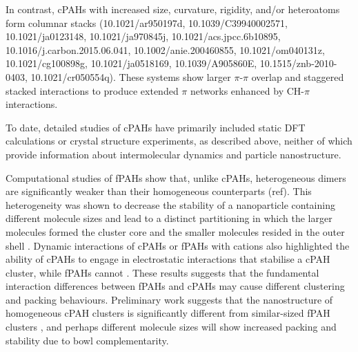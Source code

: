 In contrast, cPAHs with increased size, curvature, rigidity, and/or heteroatoms form columnar stacks (10.1021/ar950197d, 10.1039/C39940002571, 10.1021/ja0123148, 10.1021/ja970845j, 10.1021/acs.jpcc.6b10895, 10.1016/j.carbon.2015.06.041, 10.1002/anie.200460855, 10.1021/om040131z, 10.1021/cg100898g, 10.1021/ja0518169, 10.1039/A905860E, 10.1515/znb-2010-0403, 10.1021/cr050554q). These systems show larger $\pi$-$\pi$ overlap and staggered stacked interactions to produce extended $\pi$ networks enhanced by CH-$\pi$ interactions.


To date, detailed studies of cPAHs have primarily included static DFT calculations or crystal structure experiments, as described above, neither of which provide information about intermolecular dynamics and particle nanostructure.


Computational studies of fPAHs show that, unlike cPAHs, heterogeneous dimers are significantly weaker than their homogeneous counterparts (ref). This heterogeneity was shown to decrease the stability of a nanoparticle containing different molecule sizes and lead to a distinct partitioning in which the larger molecules formed the cluster core and the smaller molecules resided in the outer shell \cite{bowal2018partitioning}. Dynamic interactions of cPAHs or fPAHs with cations also highlighted the ability of cPAHs to engage in electrostatic interactions that stabilise a cPAH cluster, while fPAHs cannot \cite{bowal2019ion}. These results suggests that the fundamental interaction differences between fPAHs and cPAHs may cause different clustering and packing behaviours. Preliminary work suggests that the nanostructure of homogeneous cPAH clusters is significantly different from similar-sized fPAH clusters \cite{bowal2019ion}, and perhaps different molecule sizes will show increased packing and stability due to bowl complementarity.


